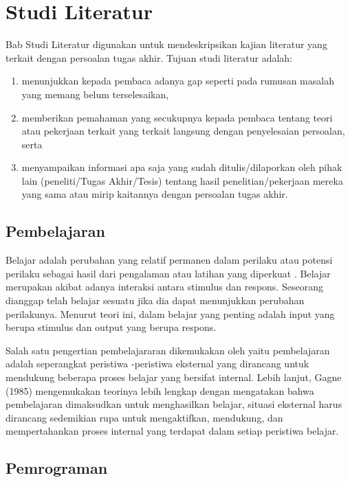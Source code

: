 \chapter{Studi Literatur}

Bab Studi Literatur digunakan untuk mendeskripsikan kajian literatur yang terkait dengan persoalan tugas akhir. Tujuan studi literatur adalah:

\begin{enumerate}
    \item menunjukkan kepada pembaca adanya gap seperti pada rumusan masalah yang memang belum terselesaikan,
    \item memberikan pemahaman yang secukupnya kepada pembaca tentang teori atau pekerjaan terkait yang terkait langsung dengan penyelesaian persoalan, serta
    \item menyampaikan informasi apa saja yang sudah ditulis/dilaporkan oleh pihak lain (peneliti/Tugas Akhir/Tesis) tentang hasil penelitian/pekerjaan mereka yang sama atau mirip kaitannya dengan persoalan tugas akhir.
\end{enumerate}

\section{Pembelajaran}
\par
Belajar adalah perubahan yang relatif permanen dalam perilaku atau potensi perilaku sebagai hasil dari pengalaman atau latihan yang diperkuat \parencite{slavin2017}. Belajar merupakan akibat adanya interaksi antara stimulus dan respons. Seseorang dianggap telah belajar sesuatu jika dia dapat menunjukkan perubahan perilakunya. Menurut teori ini, dalam belajar yang penting adalah input yang berupa stimulus dan output yang berupa respons.

\par
Salah satu pengertian pembelajararan dikemukakan oleh \textcite{gagne1970} yaitu pembelajaran adalah seperangkat peristiwa -peristiwa eksternal yang dirancang untuk mendukung beberapa proses belajar yang bersifat internal. Lebih lanjut, Gagne (1985) mengemukakan teorinya lebih lengkap dengan mengatakan bahwa pembelajaran dimaksudkan untuk menghasilkan belajar, situasi eksternal harus dirancang sedemikian rupa untuk mengaktifkan, mendukung, dan mempertahankan proses internal yang terdapat dalam setiap peristiwa belajar. 

\section{Pemrograman}
\blindtext

